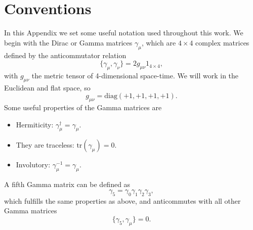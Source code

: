 
\chapter{Conventions}
\label{appex_conventions}

In this Appendix we set some useful notation used throughout this work. We begin with the Dirac or Gamma matrices $\gamma_{\mu}$, which are $4\times 4$ complex matrices defined by the anticommutator relation
\begin{equation}
\{\gamma_{\mu},\gamma_{\nu}\}=2g_{\mu\nu}1_{4\times 4},
\end{equation}
with $g_{\mu\nu}$ the metric tensor of 4-dimensional space-time. We will work in the Euclidean and flat space, so
\begin{equation}
g_{\mu\nu}=\textrm{diag}(+1,+1,+1,+1).
\end{equation}
Some useful properties of the Gamma matrices are
\begin{itemize}
\item Hermiticity: $\gamma_{\mu}^{\dagger}=\gamma_{\mu}$.
\item They are traceless: $\textrm{tr}(\gamma_{\mu})=0$.
\item Involutory: $\gamma_{\mu}^{-1}=\gamma_{\mu}$.
\end{itemize}
A fifth Gamma matrix can be defined as
\begin{equation}
\gamma_5=\gamma_0\gamma_1\gamma_2\gamma_3,
\end{equation}
which fulfills the same properties as above, and anticommutes with all other Gamma matrices
\begin{equation}
\{\gamma_5,\gamma_{\mu}\}=0.
\end{equation}

